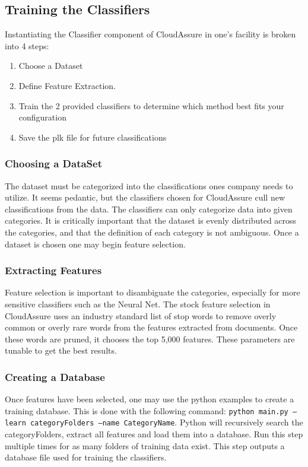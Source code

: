 \subsection{Training the Classifiers}
Instantiating the Classifier component of CloudAssure in one's facility is broken
into 4 steps:
\begin{enumerate}
    \item Choose a Dataset
    \item Define Feature Extraction.
    \item Train the 2 provided classifiers to determine which method best
        fits your configuration
    \item Save the plk file for future classifications
\end{enumerate}

\subsubsection{Choosing a DataSet}
The dataset must be categorized into the classifications ones company needs to
utilize. It seems pedantic, but the classifiers chosen for CloudAssure cull
new classifications from the data. The classifiers can only categorize data into
given categories. It is critically important that the dataset is evenly distributed across the
categories, and that the definition of each category is not ambiguous. 
Once a dataset is chosen one may begin feature selection.

\subsubsection{Extracting Features}
Feature selection is important to disambiguate the categories, especially for
more sensitive classifiers such as the Neural Net. The stock feature
selection in CloudAssure uses an industry standard list of stop words to remove
overly common or overly rare words from the features extracted from documents.
Once these words are pruned, it chooses the top 5,000 features. These parameters are tunable
 to get the best results.

\subsubsection{Creating a Database}
Once features have been selected, one may use the python examples to create
a training database. This is done with the following command: 
\texttt{python main.py --learn categoryFolders --name CategoryName}. Python
will recursively search the categoryFolders, extract all features and load
them into a database. Run this step multiple times for as many folders of
training data exist. This step outputs a database file used for training the
classifiers.

